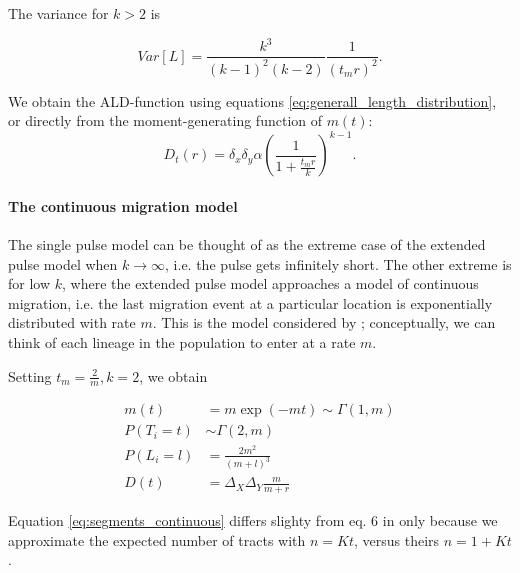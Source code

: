 \documentclass[11pt]{article}
\let\oldparagraph\paragraph
\renewcommand{\paragraph}[1]{\oldparagraph{#1}\mbox{}}
\begin{document}
The variance for $k>2$ is 
	
\begin{equation}
\label{eq:Var_l_extended_pulse}
	Var[L] = \frac{k^3}{(k-1)^2 (k-2)} \frac{1}{(t_m r)^2}\text{.}
\end{equation}
	
We obtain the ALD-function using equations \ref{eq:generall_length_distribution}, or directly from the moment-generating function of $m(t)$:
\begin{equation}
\label{eq:extended_pulse_tail}
D_t(r) = \delta_x\delta_y \alpha\left( \frac{1}{1 + \frac{t_m r}{k}}\right) ^{k-1} \text{.}
\end{equation}

	
\paragraph{The continuous migration model}

The single pulse model can be thought of as the extreme case of the extended pulse model when $k \to \infty$, i.e. the pulse gets infinitely short. The other extreme is for low $k$, where the extended pulse model approaches a model of continuous migration, i.e. the last migration event at a particular location is exponentially distributed with rate $m$. This is the model considered by \cite{pool_inference_2009}; conceptually, we can think of each lineage in the population to enter at a rate $m$. 
	
Setting $t_m = \frac{2}{m}, k=2$, we obtain

\begin{subequations}
\begin{align}
    m(t) &= m \exp(-mt) \sim \Gamma(1, m)\\
    P(T_i=t) &\sim \Gamma\left(2, m\right)\\
	P(L_i=l) &= \frac{2m^2}{(m+l)^3}\label{eq:segments_continuous}\\
	D(t) &= \Delta_X\Delta_Y \frac{m}{m + r}
\end{align}
\end{subequations}
	
Equation \ref{eq:segments_continuous} differs slighty from eq. 6 in \cite{pool_inference_2009} only because we approximate the expected number of tracts with $n=Kt$, versus theirs $n=1+Kt$. 
	
\end{document}
